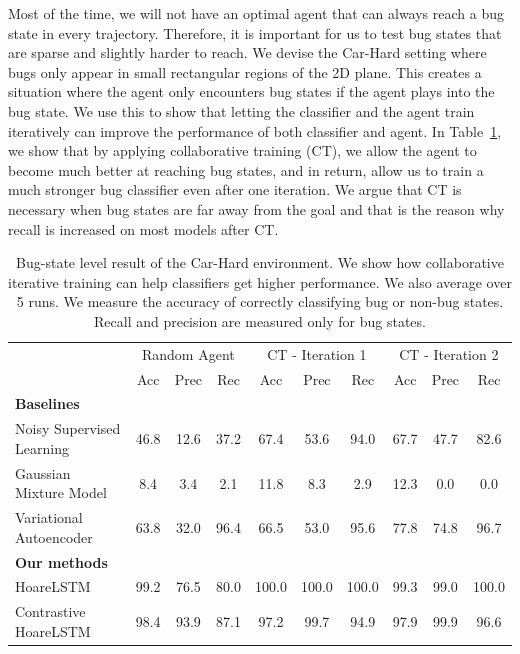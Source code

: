 \documentclass{article}
\newcommand{\EDIT}[1]{#1}%
\begin{document}
\EDIT{Most of the time, we will not have an optimal agent that can always reach a bug state in every trajectory. Therefore, it is important for us to test bug states that are sparse and slightly harder to reach. We devise the Car-Hard setting where bugs only appear in small rectangular regions of the 2D plane. This creates a situation where the agent only encounters bug states if the agent plays into the bug state.}
We use this to show that letting the classifier and the agent train iteratively can improve the performance of both classifier and agent. In Table~\ref{tab:crl}, we show that by applying collaborative training (CT), we allow the agent to become much better at reaching bug states, and in return, allow us to train a much stronger bug classifier even after one iteration. We argue that CT is necessary when bug states are far away from the goal and that is the reason why recall is increased on most models after CT.







\begin{table}[ht]
\footnotesize
\centering
\begin{tabular}{@{}lccccccccc@{}}
\toprule
      & \multicolumn{3}{c}{Random Agent} & \multicolumn{3}{c}{CT - Iteration 1} & \multicolumn{3}{c}{CT - Iteration 2} \\ 
  & Acc       & Prec      & Rec      & Acc        & Prec       & Rec        & Acc        & Prec       & Rec        \\ \midrule
  \textbf{Baselines} \\
Noisy Supervised Learning & 46.8      & 12.6      & 37.2     & 67.4       & 53.6       & 94.0       & 67.7       & 47.7       & 82.6       \\
Gaussian Mixture Model    & 8.4       & 3.4       & 2.1      & 11.8       & 8.3        & 2.9        & 12.3       & 0.0        & 0.0        \\
Variational Autoencoder   & 63.8      & 32.0      & 96.4     & 66.5       & 53.0       & 95.6       & 77.8       & 74.8       & 96.7       \\ \midrule
 \textbf{Our methods} \\ 
HoareLSTM                 & 99.2      & 76.5      & 80.0     & 100.0      & 100.0      & 100.0      & 99.3       & 99.0       & 100.0      \\
Contrastive HoareLSTM     & 98.4      & 93.9      & 87.1     & 97.2       & 99.7       & 94.9       & 97.9       & 99.9       & 96.6       \\ \bottomrule
\end{tabular}
\vspace{0.3cm}
\caption{Bug-state level result of the Car-Hard environment. We show how collaborative iterative training can help classifiers get higher performance. We also average over 5 runs. We measure the accuracy of correctly classifying bug or non-bug states. Recall and precision are measured only for bug states.} 
\label{tab:crl}
\end{table}
\end{document}
